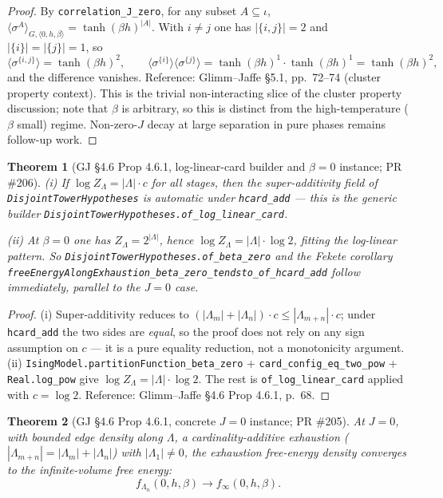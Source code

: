\documentclass[a4paper,11pt]{article}
\newtheorem{theorem}{Theorem}
\begin{document}
\begin{proof}
By \texttt{correlation\_J\_zero}, for any subset
$A \subseteq \iota$,
$\langle \sigma^A \rangle_{G,\langle 0,h,\beta\rangle} =
\tanh(\beta h)^{|A|}$.
With $i \neq j$ one has $|\{i,j\}| = 2$ and $|\{i\}| = |\{j\}| = 1$,
so
\[
  \langle \sigma^{\{i,j\}} \rangle = \tanh(\beta h)^{2}, \qquad
  \langle \sigma^{\{i\}} \rangle\langle \sigma^{\{j\}}\rangle
  = \tanh(\beta h)^{1} \cdot \tanh(\beta h)^{1}
  = \tanh(\beta h)^{2},
\]
and the difference vanishes.
Reference: Glimm--Jaffe \cite{glimm-jaffe} \S 5.1, pp.~72--74
(cluster property context). This is the trivial non-interacting
slice of the cluster property discussion; note that $\beta$ is
arbitrary, so this is distinct from the high-temperature
($\beta$ small) regime. Non-zero-$J$ decay at large separation
in pure phases remains follow-up work.
\end{proof}

\begin{theorem}[GJ \S 4.6 Prop 4.6.1, log-linear-card builder and
$\beta = 0$ instance; PR \#206]
(i) If $\log Z_\Lambda = |\Lambda| \cdot c$ for all stages, then the
super-additivity field of
\texttt{DisjointTowerHypotheses} is automatic under
\texttt{hcard\_add} — this is the generic builder
\texttt{DisjointTowerHypotheses.of\_log\_linear\_card}.

(ii) At $\beta = 0$ one has $Z_\Lambda = 2^{|\Lambda|}$, hence
$\log Z_\Lambda = |\Lambda| \cdot \log 2$, fitting the
log-linear pattern. So
\texttt{DisjointTowerHypotheses.of\_beta\_zero} and the Fekete
corollary
\texttt{freeEnergyAlongExhaustion\_beta\_zero\_tendsto\_of\_hcard\_add}
follow immediately, parallel to the $J = 0$ case.
\end{theorem}

\begin{proof}
(i) Super-additivity reduces to
$(|\Lambda_m| + |\Lambda_n|) \cdot c \le |\Lambda_{m+n}| \cdot c$;
under \texttt{hcard\_add} the two sides are \emph{equal}, so the
proof does not rely on any sign assumption on $c$ — it is a pure
equality reduction, not a monotonicity argument.
(ii) \texttt{IsingModel.partitionFunction\_beta\_zero} +
\texttt{card\_config\_eq\_two\_pow} + \texttt{Real.log\_pow} give
$\log Z_\Lambda = |\Lambda| \cdot \log 2$. The rest is
\texttt{of\_log\_linear\_card} applied with $c = \log 2$.
Reference: Glimm--Jaffe \cite{glimm-jaffe} \S 4.6 Prop 4.6.1, p.~68.
\end{proof}

\begin{theorem}[GJ \S 4.6 Prop 4.6.1, concrete $J = 0$ instance; PR \#205]
At $J = 0$, with bounded edge density along $\Lambda$, a
cardinality-additive exhaustion
($|\Lambda_{m+n}| = |\Lambda_m| + |\Lambda_n|$) with
$|\Lambda_1| \neq 0$, the exhaustion free-energy density
converges to the infinite-volume free energy:
\[
  f_{\Lambda_n}(0, h, \beta) \longrightarrow f_\infty(0, h, \beta).
\]
\end{theorem}
\end{document}
